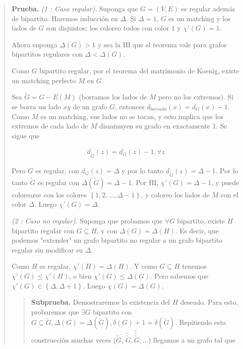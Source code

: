 \documentclass[a4paper]{article}
\begin{document}
\small
\begin{quote}

\textbf{Prueba.} \textit{(1 : Caso regular)}. Suponga que $G = (V, E) $ es
regular además de bipartito. Haremos inducción en $\Delta$. Si $\Delta = 1$,
$G$ es un matching y los lados de $G$ son disjuntos; los coloreo todos con
color $1$ y $\chi'(G) = 1$.

Ahora suponga $\Delta(G) > 1$ y sea la HI que el teorema vale para grafos
bipartitos regulares con $\Delta < \Delta(G)$.

Como $G$ bipartito regular, por el teorema del matrimonio de Koenig, existe un
matching perfecto $M$ en $G$.

Sea $\widetilde{ G } = G - E(M)$ (borramos los lados de $M$ pero no los extremos).
Si se borra un lado $xy$ de un grafo $G$, entonces $d_{borrado}(x) = d_G(x) -
1$. Como $M$ es un matching, sus lados no se tocan, y esto implica que los
extremos de cada lado de $M$ disminuyen su grado en exactamente 1. Se sigue que 

\begin{align*} d_{\widetilde{ G }}(z) = d_G(z) - 1, \forall  z \end{align*}

Pero $G$ es regular, con $d_G(z) = \Delta$ y por lo tanto $d_{\widetilde{ G }}(z) =
\Delta - 1$. Por lo tanto $\widetilde{ G }$ es regular con $\Delta(\widetilde{ G }) =
\Delta - 1$. Por HI, $\chi'(G) = \Delta - 1$, y puede colorearse con los
colores $\left\{ 1, 2, \ldots, \Delta - 1 \right\} $, y coloreo los lados de
$M$ con el color $\Delta$. Luego $\chi'(G) = \Delta$.

\textit{(2 : Caso no regular)}.  Suponga que probamos que $\forall G$
bipartito, existe $H$ bipartito regular con $G \subseteq H$, y con $\Delta(G) =
\Delta(H)$. Es decir, que podemos "extender" un grafo bipartito 
no regular a un grafo bipartito regular sin modificar su $\Delta$.

Como $H$ es regular, $\chi'(H) = \Delta(H)$. Y como $G \subseteq H$ tenemos
$\chi'(G) \leq \chi'(H)$, o bien $\chi'(G) \leq \Delta(G)$. Pero sabemos que
$\chi'(G) \in \left\{ \Delta, \Delta + 1 \right\} $. Luego $\chi(G) =
\Delta(G)$.


\small
\begin{quote}

\textbf{Subprueba.} Demostraremos la existencia del $H$ deseado. Para esto,
probaremos que $\exists G$ bipartito con $G \subseteq \widetilde{ G }, \Delta(G) =
\Delta(\widetilde{ G }), \delta(G) + 1 = \delta(\widetilde{ G })$. Repitiendo esta
construcción muchas veces ($\widetilde{ G }$, $\widetilde{ \widetilde{ G } }, \widetilde{
\widetilde{ \widetilde{ G } } }, \ldots$) llegamos a un grafo tal que 


\end{quote}
\end{quote}
\end{document}
